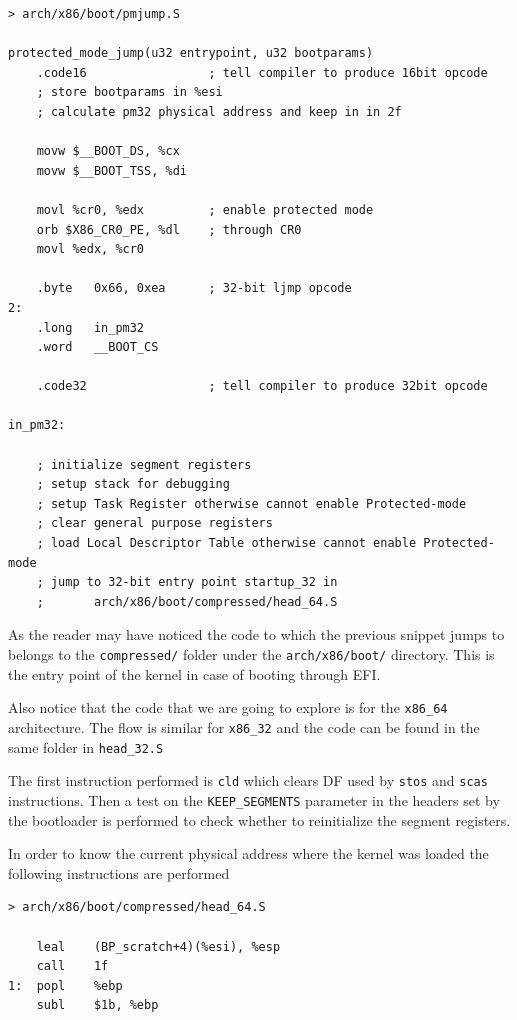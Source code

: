 \documentclass[twoside]{article}
\begin{document}
\begin{verbatim}
> arch/x86/boot/pmjump.S

protected_mode_jump(u32 entrypoint, u32 bootparams)
    .code16                 ; tell compiler to produce 16bit opcode 
    ; store bootparams in %esi
    ; calculate pm32 physical address and keep in in 2f

    movw $__BOOT_DS, %cx
    movw $__BOOT_TSS, %di

    movl %cr0, %edx         ; enable protected mode
    orb $X86_CR0_PE, %dl    ; through CR0
    movl %edx, %cr0

    .byte   0x66, 0xea      ; 32-bit ljmp opcode
2:
    .long   in_pm32			
    .word   __BOOT_CS

    .code32                 ; tell compiler to produce 32bit opcode

in_pm32:
    
    ; initialize segment registers
    ; setup stack for debugging
    ; setup Task Register otherwise cannot enable Protected-mode
    ; clear general purpose registers
    ; load Local Descriptor Table otherwise cannot enable Protected-mode
    ; jump to 32-bit entry point startup_32 in
    ;       arch/x86/boot/compressed/head_64.S
\end{verbatim}

As the reader may have noticed the code to which the previous snippet jumps to belongs to the \texttt{compressed/} folder under the \texttt{arch/x86/boot/} directory. This is the entry point of the kernel in case of booting through EFI.


Also notice that the code that we are going to explore is for the \texttt{x86_64} architecture. The flow is similar for \texttt{x86_32} and the code can be found in the same folder in \texttt{head_32.S}

The first instruction  performed is \texttt{cld} which clears DF used by \texttt{stos} and \texttt{scas} instructions. Then a test on the \texttt{KEEP_SEGMENTS} parameter in the headers set by the bootloader is performed to check whether to reinitialize the segment registers.

In order to know the current physical address where the kernel was loaded the following instructions are performed

\begin{verbatim}
> arch/x86/boot/compressed/head_64.S

    leal    (BP_scratch+4)(%esi), %esp
    call    1f
1:  popl    %ebp
    subl    $1b, %ebp

\end{verbatim}
\end{document}
